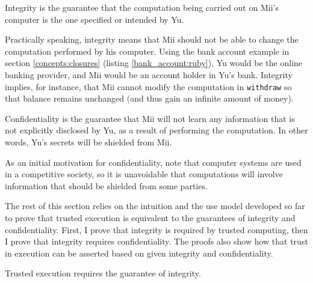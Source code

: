\begin{definition*}
Integrity is the guarantee that the computation being carried out on Mii's
computer  is the one specified or intended by Yu.
\end{definition*}

Practically speaking, integrity means that Mii should not be able to change the
computation performed by his computer. Using the bank account example in
section \ref {concepts:closures} (listing \ref{bank_account:ruby}), Yu would be
the online banking provider, and Mii would be an account holder in Yu's bank.
Integrity implies, for instance, that Mii cannot modify the computation in
\texttt{withdraw} so that balance remains unchanged (and thus gain an infinite
amount of money).

\begin{definition*}
Confidentiality is the guarantee that Mii will not learn any information that
is not explicitly disclosed by Yu, as a result of performing the computation.
In other words, Yu's secrets will be shielded from Mii.
\end{definition*}

As an initial motivation for confidentiality, note that computer systems are
used in a competitive society, so it is unavoidable that computations will
involve information that should be shielded from some parties.

The rest of this section relies on the intuition and the use model developed so
far to prove that trusted execution is equivalent to the guarantees of integrity
and confidentiality. First, I prove that integrity is required by trusted
computing, then I prove that integrity requires confidentiality. The proofs
also show how that trust in execution can be asserted based on given integrity
and confidentiality.

\begin{theorem*}
Trusted execution requires the guarantee of integrity.
\end{theorem*}

